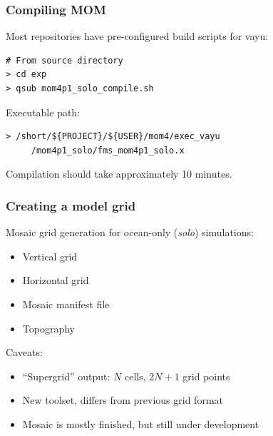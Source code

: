 \documentclass[red]{beamer}
\begin{document}
\begin{frame}[fragile]
    \frametitle{Compiling MOM}
    
    Most repositories have pre-configured build scripts for vayu:
    \begin{lstlisting}
# From source directory
> cd exp
> qsub mom4p1_solo_compile.sh
    \end{lstlisting}
    
    Executable path:
    \begin{lstlisting}
> /short/${PROJECT}/${USER}/mom4/exec_vayu
     /mom4p1_solo/fms_mom4p1_solo.x
    \end{lstlisting}
    
    Compilation should take approximately 10 minutes. 
\end{frame}

\begin{frame}
    \frametitle{Creating a model grid}
    
    Mosaic grid generation for ocean-only (\textit{solo}) simulations:
    \begin{itemize}
        \item Vertical grid
        \item Horizontal grid
        \item Mosaic manifest file
        \item Topography
    \end{itemize}
    
    Caveats:
    \begin{itemize}
        \item ``Supergrid'' output: $N$ cells, $2N+1$ grid points
        \item New toolset, differs from previous grid format
        \item Mosaic is mostly finished, but still under development
    \end{itemize}
\end{frame}
\end{document}
